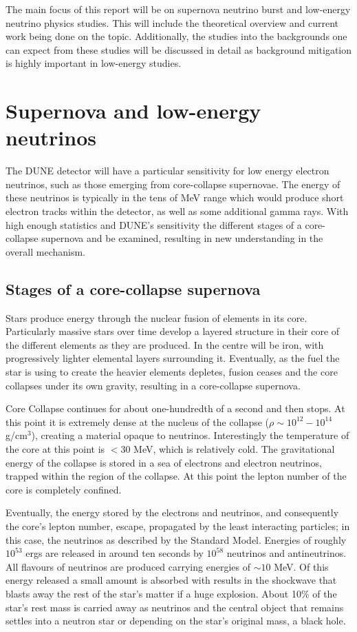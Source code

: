 \noindent The main focus of this report will be on supernova neutrino burst and low-energy neutrino physics studies. 
This will include the theoretical overview and current work being done on the topic.
Additionally, the studies into the backgrounds one can expect from these studies will be discussed in detail as background mitigation is highly important in low-energy studies.


\section{Supernova and low-energy neutrinos}
The DUNE detector will have a particular sensitivity for low energy electron neutrinos, such as those emerging from core-collapse supernovae.
The energy of these neutrinos is typically in the tens of MeV range which would produce short electron tracks within the detector, as well as some additional gamma rays.
With high enough statistics and DUNE's sensitivity the different stages of a core-collapse supernova and be examined, resulting in new understanding in the overall mechanism.

\subsection{Stages of a core-collapse supernova}
Stars produce energy through the nuclear fusion of elements in its core.
Particularly massive stars over time develop a layered structure in their core of the different elements as they are produced. 
In the centre will be iron, with progressively lighter elemental layers surrounding it. 
Eventually, as the fuel the star is using to create the heavier elements depletes, fusion ceases and the core collapses under its own gravity, resulting in a core-collapse supernova.

Core Collapse continues for about one-hundredth of a second and then stops.
At this point it is extremely dense at the nucleus of the collapse ($\rho \sim 10^{12} - 10^{14}$ g/cm$^{3}$), creating a material opaque to neutrinos.
Interestingly the temperature of the core at this point is $< 30$ MeV, which is relatively cold.
The gravitational energy of the collapse is stored in a sea of electrons and electron neutrinos, trapped within the region of the collapse.
At this point the lepton number of the core is completely confined.

Eventually, the energy stored by the electrons and neutrinos, and consequently the core's lepton number, escape, propagated by the least interacting particles; in this case, the neutrinos as described by the Standard Model.
Energies of roughly $10^{53}$ ergs are released in around ten seconds by $10^{58}$ neutrinos and antineutrinos.
All flavours of neutrinos are produced carrying energies of $\sim 10$ MeV.
Of this energy released a small amount is absorbed with results in the shockwave that blasts away the rest of the star's matter if a huge explosion. 
About 10\% of the star's rest mass is carried away as neutrinos and the central object that remains settles into a neutron star or depending on the star's original mass, a black hole.

